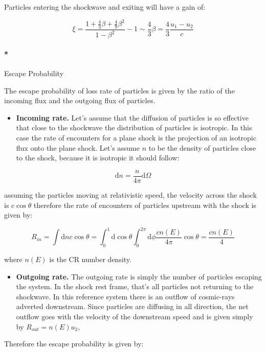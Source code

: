 \documentclass[
  letterpaper,
  DIV=11,
  numbers=noendperiod]{scrreprt}
\let\oldparagraph\paragraph
\renewcommand{\paragraph}[1]{\oldparagraph{#1}\mbox{}}
\providecommand{\tightlist}{%
  \setlength{\itemsep}{0pt}\setlength{\parskip}{0pt}}\usepackage{longtable,booktabs,array}
\begin{document}
Particles entering the shockwave and exiting will have a gain of:

\[\xi = \frac{1 + \frac{4}{3}\beta + \frac{4}{9}\beta^2}{1 -\beta^2} - 1 \sim \frac{4}{3}\beta = \frac{4}{3}\frac{u_1 - u_2}{c}\]

\paragraph*{Escape Probability}\label{escape-probability}

The escape probability of loss rate of particles is given by the ratio
of the incoming flux and the outgoing flux of particles.

\begin{itemize}
\tightlist
\item
  \textbf{Incoming rate.} Let's assume that the diffusion of particles
  is so effective that close to the shockwave the distribution of
  particles is isotropic. In this case the rate of encounters for a
  plane shock is the projection of an isotropic flux onto the plane
  shock. Let's assume \(n\) to be the density of particles close to the
  shock, because it is isotropic it should follow:
\end{itemize}

\[\mathrm{ d}n = \frac{n}{4\pi}\mathrm{ d}\Omega\]

assuming the particles moving at relativistic speed, the velocity across
the shock is \(c\cos\theta\) therefore the rate of encounters of
particles upstream with the shock is given by:

\[R_{in} = \int \mathrm{ d} n c \cos\theta = \int_0^1 \mathrm{ d} \cos \theta \int_0^{2\pi} \mathrm{ d} \phi\frac{cn(E)}{4\pi}\cos\theta = \frac{cn(E)}{4}\]

where \(n(E)\) is the CR number density.

\begin{itemize}
\tightlist
\item
  \textbf{Outgoing rate.} The outgoing rate is simply the number of
  particles escaping the system. In the shock rest frame, that's all
  particles not returning to the shockwave. In this reference system
  there is an outflow of cosmic-rays adverted downstream. Since
  particles are diffusing in all direction, the net outflow goes with
  the velocity of the downstream speed and is given simply by
  \(R_{out} = n(E) u_2\),
\end{itemize}

Therefore the escape probability is given by:
\end{document}
